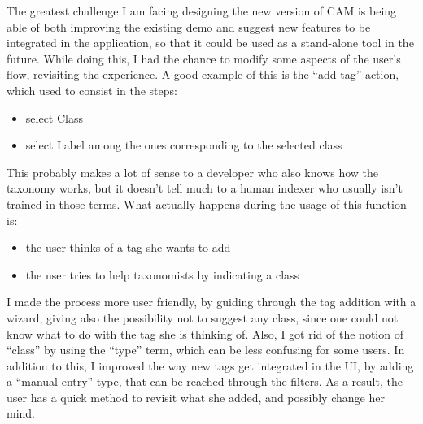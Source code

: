 \documentclass[12pt,svgnames]{memoir}
\begin{document}
The greatest challenge I am facing designing the new version of CAM is
being able of both improving the existing demo and suggest new features
to be integrated in the application, so that it could be used as a
stand-alone tool in the future. While doing this, I had the chance to
modify some aspects of the user's flow, revisiting the experience. A
good example of this is the ``add tag'' action, which used to consist in
the steps:

\begin{itemize}
\itemsep1pt\parskip0pt
\item
  select Class
\item
  select Label among the ones corresponding to the selected class
\end{itemize}

This probably makes a lot of sense to a developer who also knows how the
taxonomy works, but it doesn't tell much to a human indexer who usually
isn't trained in those terms. What actually happens during the usage of
this function is:

\begin{itemize}
\itemsep1pt\parskip0pt
\item
  the user thinks of a tag she wants to add
\item
  the user tries to help taxonomists by indicating a class
\end{itemize}

I made the process more user friendly, by guiding through the tag
addition with a wizard, giving also the possibility not to suggest any
class, since one could not know what to do with the tag she is thinking
of. Also, I got rid of the notion of ``class'' by using the ``type''
term, which can be less confusing for some users. In addition to this, I
improved the way new tags get integrated in the UI, by adding a ``manual
entry'' type, that can be reached through the filters. As a result, the
user has a quick method to revisit what she added, and possibly change
her mind.
\end{document}
